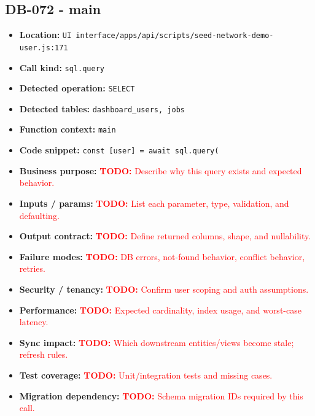 \documentclass[11pt]{article}
\newcommand{\todoitem}[1]{\textcolor{red}{\textbf{TODO:} #1}}
\begin{document}
\subsection{DB-072 - main}
\begin{itemize}[leftmargin=1.5em]
\item \textbf{Location:} \texttt{UI interface/apps/api/scripts/seed-network-demo-user.js:171}
\item \textbf{Call kind:} \texttt{sql.query}
\item \textbf{Detected operation:} \texttt{SELECT}
\item \textbf{Detected tables:} \texttt{dashboard\_users, jobs}
\item \textbf{Function context:} \texttt{main}
\item \textbf{Code snippet:} \texttt{const [user] = await sql.query(}
\item \textbf{Business purpose:} \todoitem{Describe why this query exists and expected behavior.}
\item \textbf{Inputs / params:} \todoitem{List each parameter, type, validation, and defaulting.}
\item \textbf{Output contract:} \todoitem{Define returned columns, shape, and nullability.}
\item \textbf{Failure modes:} \todoitem{DB errors, not-found behavior, conflict behavior, retries.}
\item \textbf{Security / tenancy:} \todoitem{Confirm user scoping and auth assumptions.}
\item \textbf{Performance:} \todoitem{Expected cardinality, index usage, and worst-case latency.}
\item \textbf{Sync impact:} \todoitem{Which downstream entities/views become stale; refresh rules.}
\item \textbf{Test coverage:} \todoitem{Unit/integration tests and missing cases.}
\item \textbf{Migration dependency:} \todoitem{Schema migration IDs required by this call.}
\end{itemize}
\end{document}
